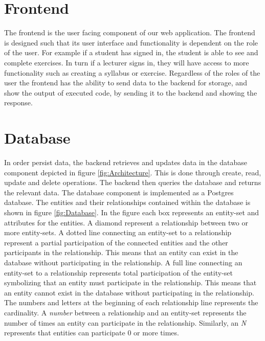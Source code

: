 \section{Frontend} \label{sec:architecture-frontend}
The frontend is the user facing component of our web application. The frontend is designed such that its user interface and functionality is dependent on the role of the user.
For example if a student has signed in, the student is able to see and complete exercises. In turn if a lecturer signs in, they will have access to more functionality such as creating a syllabus or exercise.
Regardless of the roles of the user the frontend has the ability to send data to the backend for storage, and show the output of executed code, by sending it to the backend and showing the response.
\section{Database}
In order persist data, the backend retrieves and updates data in the database component depicted in figure \ref{fig:Architecture}. This is done through create, read, update and delete operations.
The backend then queries the database and returns the relevant data.
The database component is implemented as a Postgres database. The entities and their relationships contained within the database is shown in figure \ref{fig:Database}. In the figure each box represents an entity-set and attributes for the entities. A diamond represent a relationship between two or more entity-sets.
A dotted line connecting an entity-set to a relationship represent a partial participation of the connected entities and the other participants in the relationship. This means that an entity can exist in the database without participating in the relationship.
A full line connecting an entity-set to a relationship represents total participation of the entity-set symbolizing that an entity must participate in the relationship.
This means that an entity cannot exist in the database without participating in the relationship.
The numbers and letters at the beginning of each relationship line represents the cardinality. A \textit{number} between a relationship and an entity-set represents the number of times an entity can participate in the relationship. Similarly, an \textit{N} represents that entities can participate $0$ or more times.

